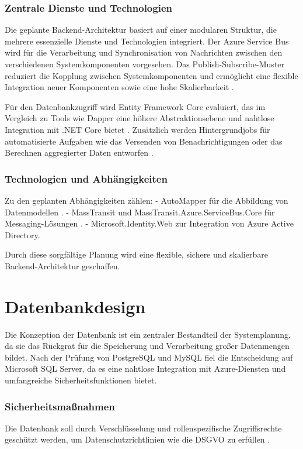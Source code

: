 \subsubsection*{Zentrale Dienste und Technologien}
Die geplante Backend-Architektur basiert auf einer modularen Struktur, die mehrere essenzielle Dienste und Technologien integriert. Der Azure Service Bus wird für die Verarbeitung und Synchronisation von Nachrichten zwischen den verschiedenen Systemkomponenten vorgesehen. Das Publish-Subscribe-Muster reduziert die Kopplung zwischen Systemkomponenten und ermöglicht eine flexible Integration neuer Komponenten sowie eine hohe Skalierbarkeit \cite{azureServiceBus2024}.

Für den Datenbankzugriff wird Entity Framework Core evaluiert, das im Vergleich zu Tools wie Dapper eine höhere Abstraktionsebene und nahtlose Integration mit .NET Core bietet \cite{entityFrameworkCore2020}. Zusätzlich werden Hintergrundjobs für automatisierte Aufgaben wie das Versenden von Benachrichtigungen oder das Berechnen aggregierter Daten entworfen \cite{backgroundTasks2017}.

\subsubsection*{Technologien und Abhängigkeiten}
Zu den geplanten Abhängigkeiten zählen:
- AutoMapper für die Abbildung von Datenmodellen \cite{automapperDocs2024}.
- MassTransit und MassTransit.Azure.ServiceBus.Core für Messaging-Lösungen \cite{masstransit2021}.
- Microsoft.Identity.Web zur Integration von Azure Active Directory.

Durch diese sorgfältige Planung wird eine flexible, sichere und skalierbare Backend-Architektur geschaffen.

\section{Datenbankdesign}
Die Konzeption der Datenbank ist ein zentraler Bestandteil der Systemplanung, da sie das Rückgrat für die Speicherung und Verarbeitung großer Datenmengen bildet. Nach der Prüfung von PostgreSQL und MySQL fiel die Entscheidung auf Microsoft SQL Server, da es eine nahtlose Integration mit Azure-Diensten und umfangreiche Sicherheitsfunktionen bietet.

\subsubsection*{Sicherheitsmaßnahmen}
Die Datenbank soll durch Verschlüsselung und rollenspezifische Zugriffsrechte geschützt werden, um Datenschutzrichtlinien wie die DSGVO zu erfüllen \cite{liu2021security}.

